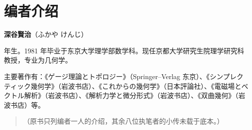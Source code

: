 \chapter*{编者介绍}

\noindent\textbf{深谷賢治}（ふかや けんじ）

 年生。1981 年毕业于东京大学理学部数学科。现任京都大学研究生院理学研究科教授，专业为几何学。

\medskip
主要著作有：《ゲージ理論とトポロジー》（Springer--Verlag 东京）、《シンプレクティック幾何学》（岩波书店）、《これからの幾何学》（日本評論社）、《電磁場とベクトル解析》（岩波书店）、《解析力学と微分形式》（岩波书店）、《双曲幾何》（岩波书店）等。

\medskip
\begin{quote}\small
（原书只列编者一人的介绍，其余八位执笔者的小传未载于底本。）
\end{quote}
